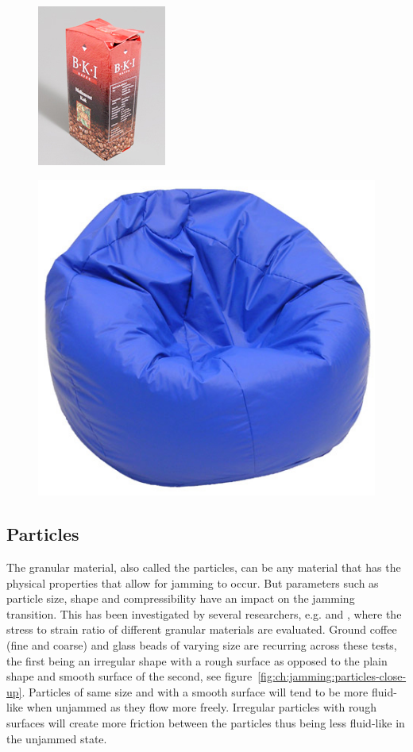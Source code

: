 \begin{figure}
\centering
\begin{minipage}[t]{.5\textwidth}
  \centering
  \includegraphics[width=.4\linewidth]{figures/jamming/coffee_packaging}
  \label{fig:ch:jamming:coffee-packaging}
\end{minipage}%
\begin{minipage}[t]{.5\textwidth}
  \centering
  \includegraphics[width=.4\linewidth]{figures/jamming/bean_bag}
  \label{fig:ch:jamming:bean-bag}
\end{minipage}
\end{figure}

\subsection{Particles}
\label{ch:jamming:particles}
The granular material, also called the particles, can be any material that has the physical properties that allow for jamming to occur. 
But parameters such as particle size, shape and compressibility have an impact on the jamming transition. 
This has been investigated by several researchers, e.g. \cite{cheng2012design} and \cite{steltz2010jamming}, where the stress to strain ratio  of different granular materials are evaluated. 
Ground coffee (fine and coarse) and glass beads of varying size are recurring across these tests, the first being an irregular shape with a rough surface as opposed to the plain shape and smooth surface of the second, see figure~\ref{fig:ch:jamming:particles-close-up}. 
Particles of same size and with a smooth surface will tend to be more fluid-like when unjammed as they flow more freely. 
Irregular particles with rough surfaces will create more friction between the particles thus being less fluid-like in the unjammed state.


